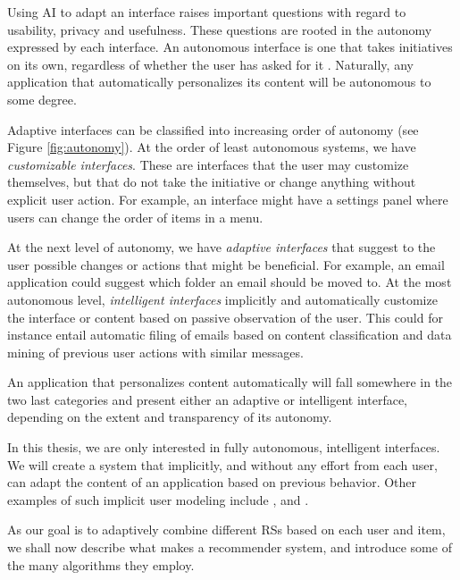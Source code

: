 Using AI to adapt an interface raises important questions with regard to usability, privacy and usefulness.
These questions are rooted in the autonomy expressed by each interface.
An autonomous interface is one that takes initiatives on its own, regardless of whether the user has asked for it \cite[p.2]{Lieberman}. 
Naturally, any application that automatically personalizes its content will be autonomous to some degree.

Adaptive interfaces can be classified into increasing order of autonomy (see Figure \ref{fig:autonomy}). 
At the order of least autonomous systems, we have \emph{customizable interfaces}. 
These are interfaces that the user may customize themselves, but that do not take the initiative or change anything without explicit user action. 
For example, an interface might have a settings panel where users can change the order of items in a menu.

At the next level of autonomy, we have \emph{adaptive interfaces} that suggest to the user possible changes or actions that might be beneficial. For example, an email application could suggest which folder an email should be moved to.
At the most autonomous level, \emph{intelligent interfaces} implicitly and automatically customize the interface or content based on passive observation of the user. 
This could for instance entail automatic filing of emails based on content classification and data mining of previous user actions with similar messages.

An application that personalizes content automatically will fall somewhere in the two last categories and present either an adaptive or intelligent interface, 
depending on the extent and transparency of its autonomy.

In this thesis, we are only interested in fully autonomous, intelligent interfaces.
We will create a system that implicitly, and without any effort from each user,
can adapt the content of an application based on previous behavior.
Other examples of such implicit user modeling include \cite{Qiu2006}, \cite{Shen2005} and \cite{Carmel2009}.

As our goal is to adaptively combine different RSs based on each user and item,
we shall now describe what makes a recommender system, and introduce some of the many algorithms they employ.
